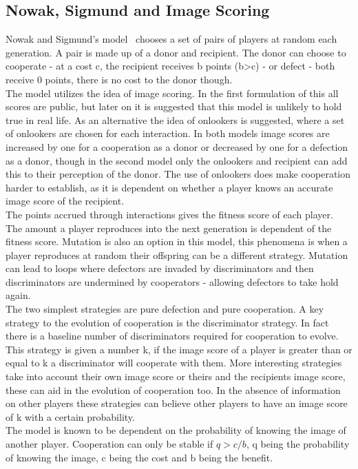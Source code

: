 \documentclass[twoside,twocolumn]{article}
\begin{document}
\subsection{Nowak, Sigmund and Image Scoring}
Nowak and Sigmund's model~\cite{evol_indirect_image} chooses a set of pairs of players at random each generation. A pair is made up of a donor and recipient. The donor can choose to cooperate - at a cost c, the recipient receives b points (b>c) - or defect - both receive 0 points, there is no cost to the donor though.\\
The model utilizes the idea of image scoring. In the first formulation of this all scores are public, but later on it is suggested that this model is unlikely to hold true in real life. As an alternative the idea of onlookers is suggested, where a set of onlookers are chosen for each interaction. In both models image scores are increased by one for a cooperation as a donor or decreased by one for a defection as a donor, though in the second model only the onlookers and recipient can add this to their perception of the donor. The use of onlookers does make cooperation harder to establish, as it is dependent on whether a player knows an accurate image score of the recipient.\\
The points accrued through interactions gives the fitness score of each player. The amount a player reproduces into the next generation is dependent of the fitness score. Mutation is also an option in this model, this phenomena is when a player reproduces at random their offspring can be a different strategy. Mutation can lead to loops where defectors are invaded by discriminators and then discriminators are undermined by cooperators - allowing defectors to take hold again.\\
The two simplest strategies are pure defection and pure cooperation. A key strategy to the evolution of cooperation is the discriminator strategy. In fact there is a baseline number of discriminators required for cooperation to evolve. This strategy is given a number k, if the image score of a player is greater than or equal to k a discriminator will cooperate with them. More interesting strategies take into account their own image score or theirs and the recipients image score, these can aid in the evolution of cooperation too. In the absence of information on other players these strategies can believe other players to have an image score of k with a certain probability.\\
The model is known to be dependent on the probability of knowing the image of another player. Cooperation can only be stable if $q > c/b$, q being the probability of knowing the image, c being the cost and b being the benefit.\\
\end{document}
